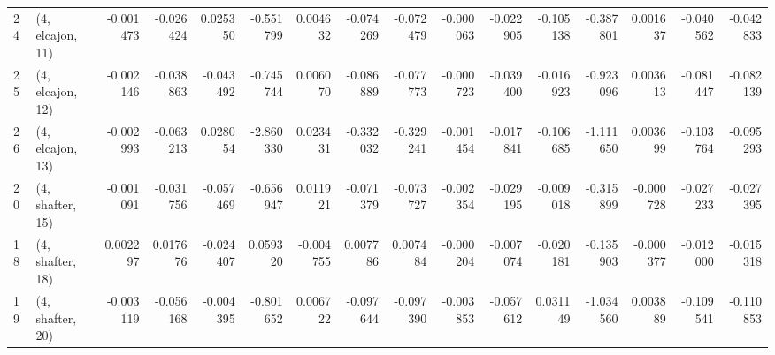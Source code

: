 \begin{tabular}{llrrrrrrrrrrrrrr}
24 &  (4, elcajon, 11) &  -0.001473 & -0.026424 &  0.025350 &  -0.551799 &  0.004632 &  -0.074269 & -0.072479 & -0.000063 & -0.022905 & -0.105138 &  -0.387801 &  0.001637 & -0.040562 & -0.042833 \\
25 &  (4, elcajon, 12) &  -0.002146 & -0.038863 & -0.043492 &  -0.745744 &  0.006070 &  -0.086889 & -0.077773 & -0.000723 & -0.039400 & -0.016923 &  -0.923096 &  0.003613 & -0.081447 & -0.082139 \\
26 &  (4, elcajon, 13) &  -0.002993 & -0.063213 &  0.028054 &  -2.860330 &  0.023431 &  -0.332032 & -0.329241 & -0.001454 & -0.017841 & -0.106685 &  -1.111650 &  0.003699 & -0.103764 & -0.095293 \\
20 &  (4, shafter, 15) &  -0.001091 & -0.031756 & -0.057469 &  -0.656947 &  0.011921 &  -0.071379 & -0.073727 & -0.002354 & -0.029195 & -0.009018 &  -0.315899 & -0.000728 & -0.027233 & -0.027395 \\
18 &  (4, shafter, 18) &   0.002297 &  0.017676 & -0.024407 &   0.059320 & -0.004755 &   0.007786 &  0.007484 & -0.000204 & -0.007074 & -0.020181 &  -0.135903 & -0.000377 & -0.012000 & -0.015318 \\
19 &  (4, shafter, 20) &  -0.003119 & -0.056168 & -0.004395 &  -0.801652 &  0.006722 &  -0.097644 & -0.097390 & -0.003853 & -0.057612 &  0.031149 &  -1.034560 &  0.003889 & -0.109541 & -0.110853 \\
\bottomrule
\end{tabular}

